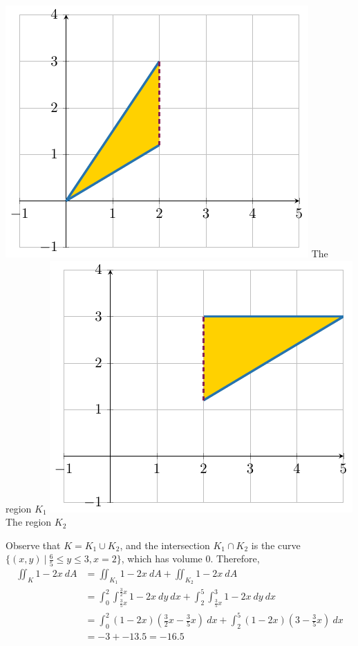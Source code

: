 \begin{example}
    \begin{center}
        \includegraphics{chapters/4-IntegrationRn/figures/figures-decomposek1.pdf}
        The region $K_1$
        \includegraphics{chapters/4-IntegrationRn/figures/figures-decomposek2.pdf}
        The region $K_2$
    \end{center}

    Observe that $K = K_1 \cup K_2$, and the intersection $K_1 \cap K_2$ is the curve $\{(x,y) \ | \ \frac{6}{5} \leq y \leq 3, x=2 \}$, which has volume 0.
    Therefore, 
    \begin{align*}
        \iint_K 1-2x \ dA &= \iint_{K_1} 1-2x \ dA + \iint_{K_2} 1-2x \ dA\\
        &= \int_0^2\int_{\frac{3}{5}x}^{\frac{3}{2}x} 1-2x \ dy \ dx + \int_2^5\int_{\frac{3}{5}x}^{3} 1-2x \ dy \ dx \\
        &= \int_0^2 (1-2x)(\frac{3}{2}x-\frac{3}{5}x) \ dx + \int_2^5 (1-2x)(3-\frac{3}{5}x) \ dx \\
        &= -3 + -13.5 = -16.5        
    \end{align*}
    
    
    
\end{example}




